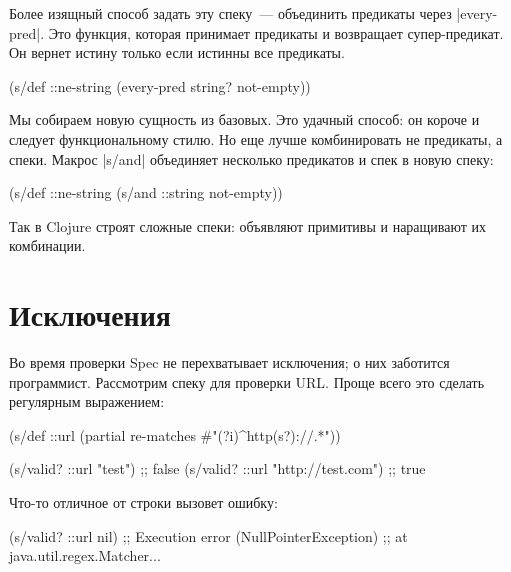 Более изящный способ задать эту спеку~--- объединить предикаты через
\spverb|every-pred|. Это функция, которая принимает предикаты и возвращает
супер-предикат. Он вернет истину только если истинны все предикаты.

\begin{english}
  \begin{clojure}
(s/def ::ne-string
  (every-pred string? not-empty))
  \end{clojure}
\end{english}

Мы собираем новую сущность из базовых. Это удачный способ: он короче и следует
функциональному стилю. Но еще лучше комбинировать не предикаты, а спеки. Макрос
\spverb|s/and| объединяет несколько предикатов и спек в новую спеку:

\begin{english}
  \begin{clojure}
(s/def ::ne-string
  (s/and ::string not-empty))
  \end{clojure}
\end{english}

Так в Clojure строят сложные спеки: объявляют примитивы и наращивают их
комбинации.

\section{Исключения}

Во время проверки Spec не перехватывает исключения; о них заботится
программист. Рассмотрим спеку для проверки URL. Проще всего это сделать
регулярным выражением:

\begin{english}
  \begin{clojure}
(s/def ::url
  (partial re-matches #"(?i)^http(s?)://.*"))

(s/valid? ::url "test")            ;; false
(s/valid? ::url "http://test.com") ;; true
  \end{clojure}
\end{english}

\noindent
Что-то отличное от строки вызовет ошибку:

\begin{english}
  \begin{clojure}
(s/valid? ::url nil)
;; Execution error (NullPointerException)
;; at java.util.regex.Matcher...
  \end{clojure}
\end{english}

